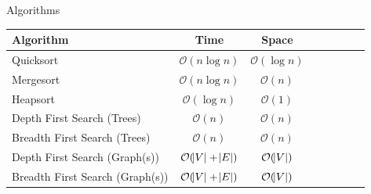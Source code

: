 \documentclass [12pt, executivepaper]{article}
\begin{document}
\vspace{3mm}

\hspace{-8mm} Algorithms

\vspace{3mm}

\begin{adjustbox}{max height=4in, max width=4in}

    \begin{tabular}{l*{6}{c}r}
    
    Algorithm & Time & Space \\
    
    \hline
    
   Quicksort & $\mathcal{O}(n \log{} n)$ & $\mathcal{O}(\log{} n)$  \\
    
   Mergesort & $\mathcal{O}(n \log{} n)$ & $\mathcal{O}(n)$  \\
    
   Heapsort & $\mathcal{O}(\log{} n)$ & $\mathcal{O}(1)$ \\
    
   Depth First Search (Trees) & $\mathcal{O}(n)$ & $\mathcal{O}(n)$  \\
    
   Breadth First Search (Trees) & $\mathcal{O}(n)$ & $\mathcal{O}(n)$  \\
    
   Depth First Search (Graph(s)) & $\mathcal{O}(\abs{V} + \abs{E})$ & $\mathcal{O}(\abs{V})$  \\
    
   Breadth First Search (Graph(s)) & $\mathcal{O}(\abs{V} + \abs{E})$ & $\mathcal{O}(\abs{V})$
    
    \end{tabular}
    
\end{adjustbox}

\pagebreak

\vspace*{-40mm}
\end{document}
